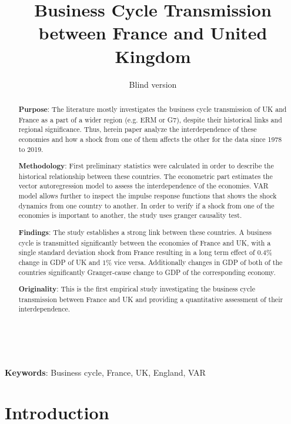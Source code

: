 \documentclass{article}
\title{Business Cycle Transmission between France and United Kingdom}
\author[1]{Blind version}
\affil[1]{University}
\begin{document}
\maketitle

\begin{abstract}
\textbf{Purpose}: The literature mostly investigates the business cycle transmission of UK and France as a part of a wider region (e.g. ERM or G7), despite their historical links and regional significance. Thus, herein paper analyze the interdependence of these economies and how a shock from one of them affects the other for the data since 1978 to 2019.

\textbf{Methodology}: First preliminary statistics were calculated in order to describe the historical relationship between these countries. The econometric part estimates the vector autoregression model to assess the interdependence of the economies. VAR model allows further to inspect the impulse response functions that shows the shock dynamics from one country to another. In order to verify if a shock from one of the economies is important to another, the study uses granger causality test.

\textbf{Findings}: The study establishes a strong link between these countries. A business cycle is transmitted significantly between the economies of France and UK, with a single standard deviation shock from France resulting in a long term effect of $0.4\%$ change in GDP of UK and $1\%$ vice versa. Additionally changes in GDP of both of the countries significantly Granger-cause change to GDP of the corresponding economy.

\textbf{Originality}: This is the first empirical study investigating the business cycle transmission between France and UK and providing a quantitative assessment of their interdependence.

\end{abstract}

\

\textbf{Keywords}: Business cycle, France, UK, England, VAR

\section*{Introduction}
\end{document}
